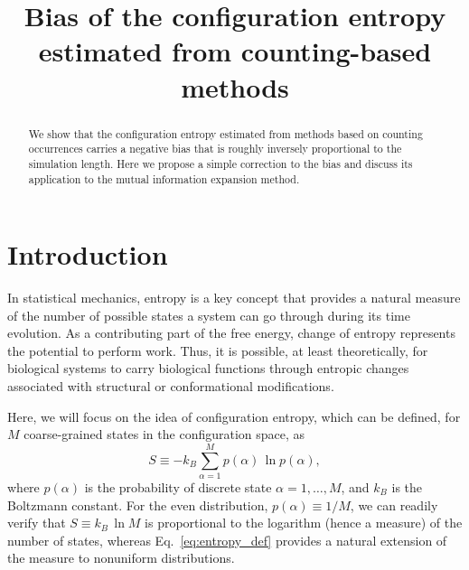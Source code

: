 \documentclass[reprint, superscriptaddress]{revtex4-1}
\begin{document}
\title{Bias of the configuration entropy estimated from counting-based methods}



\begin{abstract}
We show that the configuration entropy estimated from methods based on counting occurrences
carries a negative bias
that is roughly inversely proportional to the simulation length.
%
Here we propose a simple correction to the bias
and discuss its application to the mutual information expansion method.
\end{abstract}

\maketitle


\section{Introduction}

In statistical mechanics,
entropy is a key concept that
provides a natural measure of
the number of possible states a system can go through during its time evolution.
%
As a contributing part of the free energy,
change of entropy represents the potential to perform work.
%
Thus, it is possible, at least theoretically, for biological systems
to carry biological functions through entropic changes
associated with structural or conformational modifications.\cite{drake2018}


Here, we will focus on the idea of configuration entropy,
which can be defined,
for $M$ coarse-grained states in the configuration space, as
%
\begin{equation}
  S
  \equiv
  -k_B \sum_{\alpha = 1}^M p(\alpha) \, \ln p(\alpha)
  ,
  \label{eq:entropy_def}
\end{equation}
%
where $p(\alpha)$ is the probability of discrete state $\alpha = 1, \dots, M$,
and $k_B$ is the Boltzmann constant.
%
For the even distribution, $p(\alpha) \equiv 1/M$,
we can readily verify that $S \equiv k_B \, \ln M$
is proportional to the logarithm (hence a measure) of the number of states,
whereas Eq.~\eqref{eq:entropy_def}
provides a natural extension of the measure to nonuniform distributions.
\end{document}
